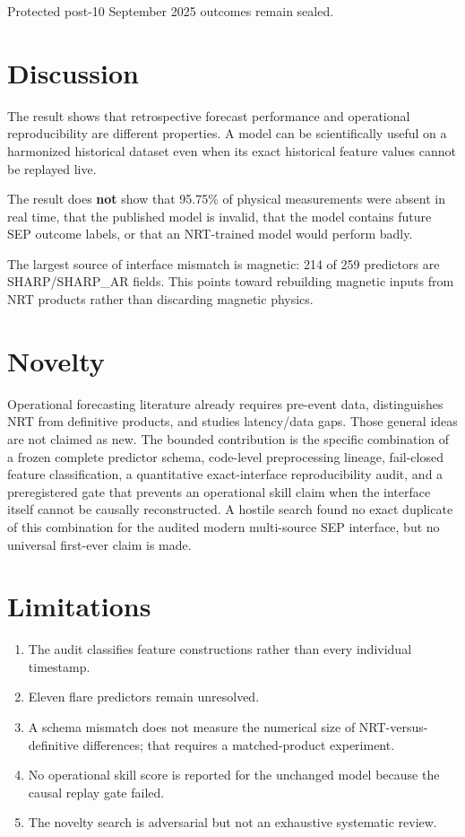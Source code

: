 \documentclass[11pt]{article}
\begin{document}
Protected post-10 September 2025 outcomes remain sealed.

\section{Discussion}
The result shows that retrospective forecast performance and operational reproducibility are different properties. A model can be scientifically useful on a harmonized historical dataset even when its exact historical feature values cannot be replayed live.

The result does \textbf{not} show that 95.75\% of physical measurements were absent in real time, that the published model is invalid, that the model contains future SEP outcome labels, or that an NRT-trained model would perform badly.

The largest source of interface mismatch is magnetic: 214 of 259 predictors are SHARP/SHARP\_AR fields. This points toward rebuilding magnetic inputs from NRT products rather than discarding magnetic physics.

\section{Novelty}
Operational forecasting literature already requires pre-event data, distinguishes NRT from definitive products, and studies latency/data gaps. Those general ideas are not claimed as new. The bounded contribution is the specific combination of a frozen complete predictor schema, code-level preprocessing lineage, fail-closed feature classification, a quantitative exact-interface reproducibility audit, and a preregistered gate that prevents an operational skill claim when the interface itself cannot be causally reconstructed. A hostile search found no exact duplicate of this combination for the audited modern multi-source SEP interface, but no universal first-ever claim is made.

\section{Limitations}
\begin{enumerate}
\item The audit classifies feature constructions rather than every individual timestamp.
\item Eleven flare predictors remain unresolved.
\item A schema mismatch does not measure the numerical size of NRT-versus-definitive differences; that requires a matched-product experiment.
\item No operational skill score is reported for the unchanged model because the causal replay gate failed.
\item The novelty search is adversarial but not an exhaustive systematic review.
\end{enumerate}
\end{document}
